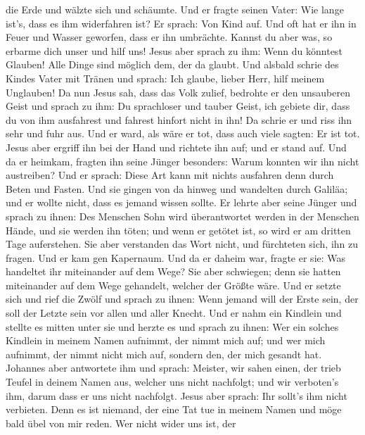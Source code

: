 die Erde und wälzte sich und schäumte.  Und er fragte
seinen Vater: Wie lange ist's, dass es ihm widerfahren ist? Er sprach:
Von Kind auf.  Und oft hat er ihn in Feuer und Wasser
geworfen, dass er ihn umbrächte. Kannst du aber was, so erbarme dich
unser und hilf uns!  Jesus aber sprach zu ihm: Wenn du
könntest Glauben! Alle Dinge sind möglich dem, der da glaubt.
 Und alsbald schrie des Kindes Vater mit Tränen und sprach:
Ich glaube, lieber Herr, hilf meinem Unglauben!  Da nun
Jesus sah, dass das Volk zulief, bedrohte er den unsauberen Geist und
sprach zu ihm: Du sprachloser und tauber Geist, ich gebiete dir, dass du
von ihm ausfahrest und fahrest hinfort nicht in ihn!  Da
schrie er und riss ihn sehr und fuhr aus. Und er ward, als wäre er tot,
dass auch viele sagten: Er ist tot.  Jesus aber ergriff ihn
bei der Hand und richtete ihn auf; und er stand auf.  Und
da er heimkam, fragten ihn seine Jünger besonders: Warum konnten wir ihn
nicht austreiben?  Und er sprach: Diese Art kann mit nichts
ausfahren denn durch Beten und Fasten.  Und sie gingen von
da hinweg und wandelten durch Galiläa; und er wollte nicht, dass es
jemand wissen sollte.  Er lehrte aber seine Jünger und
sprach zu ihnen: Des Menschen Sohn wird überantwortet werden in der
Menschen Hände, und sie werden ihn töten; und wenn er getötet ist, so
wird er am dritten Tage auferstehen.  Sie aber verstanden
das Wort nicht, und fürchteten sich, ihn zu fragen.  Und er
kam gen Kapernaum. Und da er daheim war, fragte er sie: Was handeltet
ihr miteinander auf dem Wege?  Sie aber schwiegen; denn sie
hatten miteinander auf dem Wege gehandelt, welcher der Größte wäre.
 Und er setzte sich und rief die Zwölf und sprach zu ihnen:
Wenn jemand will der Erste sein, der soll der Letzte sein vor allen und
aller Knecht.  Und er nahm ein Kindlein und stellte es
mitten unter sie und herzte es und sprach zu ihnen:  Wer
ein solches Kindlein in meinem Namen aufnimmt, der nimmt mich auf; und
wer mich aufnimmt, der nimmt nicht mich auf, sondern den, der mich
gesandt hat.  Johannes aber antwortete ihm und sprach:
Meister, wir sahen einen, der trieb Teufel in deinem Namen aus, welcher
uns nicht nachfolgt; und wir verboten's ihm, darum dass er uns nicht
nachfolgt.  Jesus aber sprach: Ihr sollt's ihm nicht
verbieten. Denn es ist niemand, der eine Tat tue in meinem Namen und
möge bald übel von mir reden.  Wer nicht wider uns ist, der
